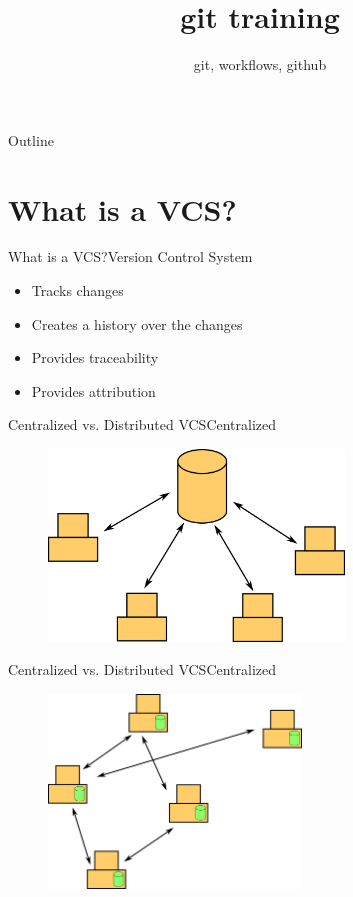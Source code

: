 \documentclass[aspectratio=169]{beamer}
\title {git training}
\subtitle{git, workflows, github}
\begin{document}
\begin{frame}
\titlepage
\end{frame}

\begin{frame}{Outline}
    \tableofcontents
\end{frame}

\section{What is a VCS?}
\begin{frame}{What is a VCS?}{Version Control System}
\begin{itemize}
	\item Tracks changes
	\item Creates a history over the changes
	\item Provides traceability
	\item Provides attribution
\end{itemize}
\end{frame}

\begin{frame}{Centralized vs. Distributed VCS}{Centralized}
\begin{figure}
	\centering
	\includegraphics[width=0.7\textwidth]{01_centralized_vcs}
\end{figure}
\end{frame}

\begin{frame}{Centralized vs. Distributed VCS}{Centralized}
\begin{figure}
	\centering
	\includegraphics[width=0.6\textwidth]{02_distributed_vcs}
\end{figure}
\end{frame}
\end{document}
